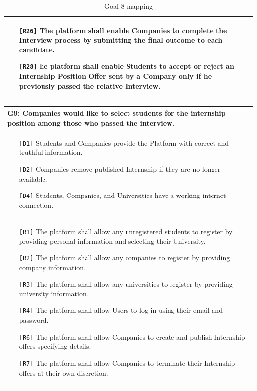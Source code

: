 \begin{table}[H]
\begin{tabular}{|p{15cm}|}
\begin{itemize}
            \item[\texttt{[R26]}] The platform shall enable Companies to complete the Interview process by submitting the final outcome to each candidate.
            \item[\texttt{[R28]}] he platform shall enable Students to accept or reject an Internship Position Offer sent by a Company only if he previously passed the relative Interview.
        \end{itemize} \\ \hline
    \end{tabular}
    \caption{Goal 8 mapping}
    \label{tab:G8}
\end{table}


\begin{table}[H]
    \centering
    \begin{tabular}{|p{15cm}|}
        \hline
        \textbf{G9:} Companies would like to select students for the internship position among those who passed the interview. \\ \hline
        \begin{itemize}
            \item[\texttt{[D1]}] Students and Companies provide the Platform with correct and truthful information.
            \item[\texttt{[D2]}] Companies remove published Internship if they are no longer available. 
            \item[\texttt{[D4]}] Students, Companies, and Universities have a working internet connection.
        \end{itemize} \\ \hline
        \begin{itemize}
            \item[\texttt{[R1]}] The platform shall allow any unregistered students to register by providing personal information and selecting their University.
            \item[\texttt{[R2]}] The platform shall allow any companies to register by providing company information.
            \item[\texttt{[R3]}] The platform shall allow any universities to register by providing university information.
            \item[\texttt{[R4]}] The platform shall allow Users to log in using their email and password.
            \item[\texttt{[R6]}] The platform shall allow Companies to create and publish Internship offers specifying details.
            \item[\texttt{[R7]}] The platform shall allow Companies to terminate their Internship offers at their own discretion.

\end{itemize}
\end{tabular}
\end{table}
